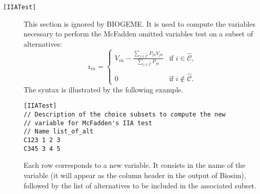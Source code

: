 \documentclass[12pt,a4paper]{article}
\newcommand{\specitem}[1]{\texttt{[#1]}}
\newcommand{\C}{\mathcal{C}}
\begin{document}
\begin{description}
\item[\specitem{IIATest}]  This section is ignored by BIOGEME. It is used to compute the variables necessary to perform the McFadden omitted variables test on a subset of alternatives:
\begin{equation}
\label{eq:variablesIIAtest}
z_{in} = \left\{ 
\begin{array}{ll}
\displaystyle V_{in} - \frac{\sum_{j\in \widehat{\C}} P_{jn} V_{jn}}{\sum_{j\in \widehat{\C}} P_{jn}} & \text{if } i \in \widehat{\C}, \\&\\
0 & \text{if } i \not\in \widehat{\C}. 
\end{array}
\right.
\end{equation}
The syntax is illustrated by the following example.
\begin{verbatim}
[IIATest]
// Description of the choice subsets to compute the new 
// variable for McFadden's IIA test
// Name list_of_alt
C123 1 2 3
C345 3 4 5
\end{verbatim}
Each row corresponds to a new variable. It consists in the name of the variable (it will appear as the column header in the output of Biosim), followed by the list of alternatives to be included in the associated subset. 

\end{description}








\end{document}
